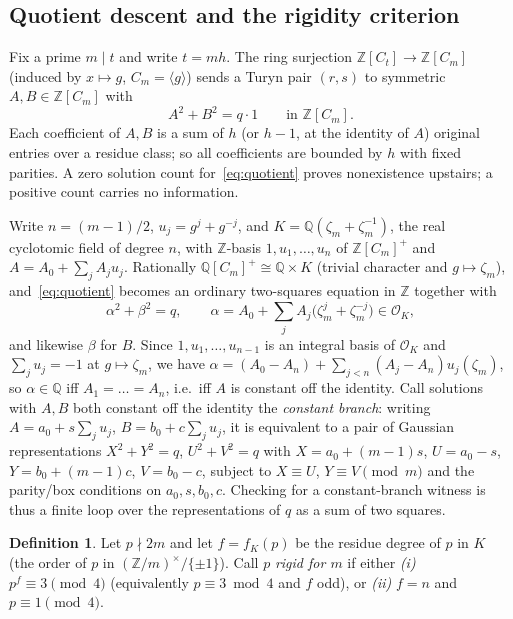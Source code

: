 \documentclass[11pt]{article}
\theoremstyle{plain}
\theoremstyle{definition}
\newtheorem{definition}[theorem]{Definition}
\theoremstyle{remark}
\newcommand{\Z}{\mathbb Z}
\newcommand{\Q}{\mathbb Q}
\newcommand{\OK}{\mathcal O_K}
\begin{document}
\subsection{Quotient descent and the rigidity criterion}\label{sec:rigidity}

Fix a prime $m\mid t$ and write $t=mh$. The ring surjection $\Z[C_t]\to\Z[C_m]$
(induced by $x\mapsto g$, $C_m=\langle g\rangle$) sends a Turyn pair $(r,s)$ to
symmetric $A,B\in\Z[C_m]$ with
\begin{equation}\label{eq:quotient}
  A^2+B^2=q\cdot1\qquad\text{in }\Z[C_m].
\end{equation}
Each coefficient of $A,B$ is a sum of $h$ (or $h-1$, at the identity of $A$)
original entries over a residue class; so all coefficients are bounded by $h$
with fixed parities. A zero solution count for~\eqref{eq:quotient} proves
nonexistence upstairs; a positive count carries no information.

Write $n=(m-1)/2$, $u_j=g^j+g^{-j}$, and $K=\Q(\zeta_m+\zeta_m^{-1})$, the real
cyclotomic field of degree $n$, with $\Z$-basis $1,u_1,\dots,u_n$ of $\Z[C_m]^+$
and $A=A_0+\sum_j A_j u_j$. Rationally $\Q[C_m]^+\cong\Q\times K$ (trivial
character and $g\mapsto\zeta_m$), and~\eqref{eq:quotient} becomes an ordinary
two-squares equation in $\Z$ together with
\begin{equation}\label{eq:Klevel}
  \alpha^2+\beta^2=q,\qquad
  \alpha=A_0+\sum_j A_j\bigl(\zeta_m^j+\zeta_m^{-j}\bigr)\in\OK,
\end{equation}
and likewise $\beta$ for $B$. Since $1,u_1,\dots,u_{n-1}$ is an integral basis
of $\OK$ and $\sum_j u_j=-1$ at $g\mapsto\zeta_m$, we have
$\alpha=(A_0-A_n)+\sum_{j<n}(A_j-A_n)u_j(\zeta_m)$, so $\alpha\in\Q$ iff
$A_1=\dots=A_n$, i.e.\ iff $A$ is constant off the identity. Call solutions with
$A,B$ both constant off the identity the \emph{constant branch}: writing
$A=a_0+s\sum_j u_j$, $B=b_0+c\sum_j u_j$, it is equivalent to a pair of Gaussian
representations $X^2+Y^2=q$, $U^2+V^2=q$ with $X=a_0+(m-1)s$, $U=a_0-s$,
$Y=b_0+(m-1)c$, $V=b_0-c$, subject to $X\equiv U$, $Y\equiv V\pmod m$ and the
parity/box conditions on $a_0,s,b_0,c$. Checking for a constant-branch witness
is thus a finite loop over the representations of $q$ as a sum of two squares.

\begin{definition}\label{def:rigid}
Let $p\nmid2m$ and let $f=f_K(p)$ be the residue degree of $p$ in $K$ (the order
of $p$ in $(\Z/m)^\times/\{\pm1\}$). Call $p$ \emph{rigid for $m$} if either
\emph{(i)} $p^f\equiv3\pmod4$ (equivalently $p\equiv3\bmod4$ and $f$ odd), or
\emph{(ii)} $f=n$ and $p\equiv1\pmod4$.
\end{definition}
\end{document}
